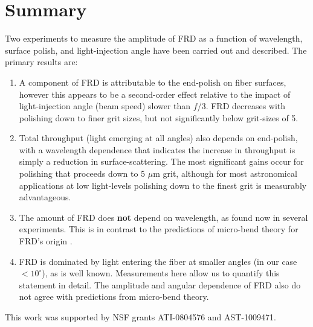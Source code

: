 \section{Summary}
\label{FRD:sec:summary}
Two experiments to 
measure the
amplitude of FRD as a function of wavelength, surface polish, 
and light-injection angle have been carried out and described.
The primary results are:
\begin{enumerate}

\item A component of FRD is attributable to the end-polish
  on fiber surfaces, however this appears to be a second-order effect
  relative to the impact of light-injection angle (beam speed) slower
  than $f$/3. FRD decreases with polishing down to finer grit sizes, but
  not significantly below grit-sizes of 5\mum.

\item Total throughput (light emerging at all angles) also depends on
  end-polish, with a wavelength dependence that indicates the increase
  in throughput is simply a reduction in surface-scattering.  The most
  significant gains occur for polishing that proceeds down to 5 $\mu$m
  grit, although for most astronomical applications at low
  light-levels polishing down to the finest grit is measurably
  advantageous.

\item The amount of FRD does \textbf{not} depend on wavelength, as found now
  in several experiments. This is in contrast to the predictions of micro-bend
  theory for FRD's origin \citep{Carrasco}.

\item FRD is dominated by light entering the fiber at smaller angles
  (in our case $<10^{\circ}$), as is well known. Measurements here
  allow us to quantify this statement in detail. The amplitude and
  angular dependence of FRD also do not agree with predictions from
  micro-bend theory.

\end{enumerate}

This work was supported by NSF grants ATI-0804576 and AST-1009471.




